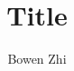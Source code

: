 \documentclass[a4paper, twoside, 12 pt]{report}
\title{Title}
\author{Bowen Zhi}
\begin{document}








\renewcommand{\bibname}{Reference}

\end{document}
